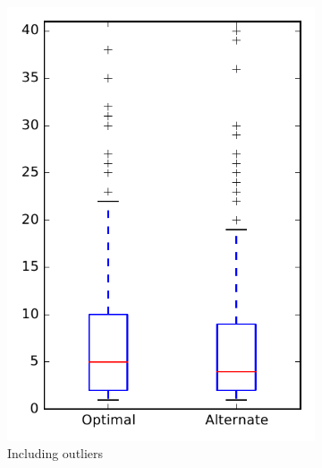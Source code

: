 
\begin{figure}
    \centering
    \begin{subfigure}{.4\textwidth}
        \centering
        \includegraphics[height=0.4\textheight]{figures/combo/dit_rq1_mahout}
        \caption{Including outliers}\label{fig:combo:dit:rq1:mahout_outlier}
    \end{subfigure}%
    \begin{subfigure}{.4\textwidth}
        \centering

\end{subfigure}
\end{figure}
